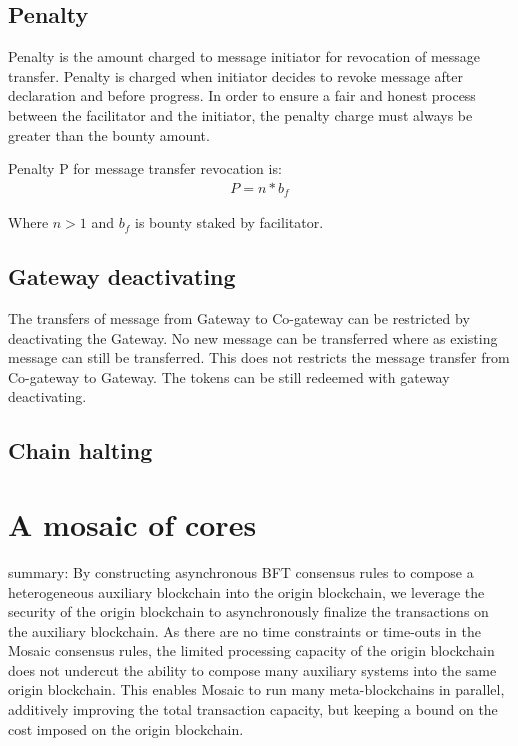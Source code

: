 \documentclass[12pt,a4paper]{article}
\begin{document}
\subsection{Penalty}\label{gateway:penalty}
Penalty is the amount charged to message initiator for revocation of message transfer. 
Penalty is charged when initiator decides to revoke message after declaration and before progress.  
In order to ensure a fair and honest process between the facilitator and the initiator, the penalty charge must always be greater than the bounty amount.  

Penalty P for message transfer revocation is:
 \begin{align}
 	P = n * b_f
 \end{align}
                                           
Where $n > 1$  and $b_f$ is bounty staked by facilitator. 

\subsection{Gateway deactivating}\label{gateway:deactivating}
The transfers of message from Gateway to Co-gateway can be restricted by deactivating the Gateway.
No new message can be transferred where as existing message can still be transferred.
This does not restricts the message transfer from Co-gateway to Gateway. 
The tokens can be still redeemed with gateway deactivating.

\subsection{Chain halting}
                                                            

%
%
\section{A mosaic of cores}

summary:
By constructing asynchronous BFT consensus rules to compose a heterogeneous auxiliary blockchain into the origin blockchain, we leverage the security of the origin blockchain to asynchronously finalize the transactions on the auxiliary blockchain.
As there are no time constraints or time-outs in the Mosaic consensus rules, the limited processing capacity of the origin blockchain does not undercut the ability to compose many auxiliary systems into the same origin blockchain.
This enables Mosaic to run many meta-blockchains in parallel, additively improving the total transaction capacity, but keeping a bound on the cost imposed on the origin blockchain.

%
%

%
%

\end{document}
